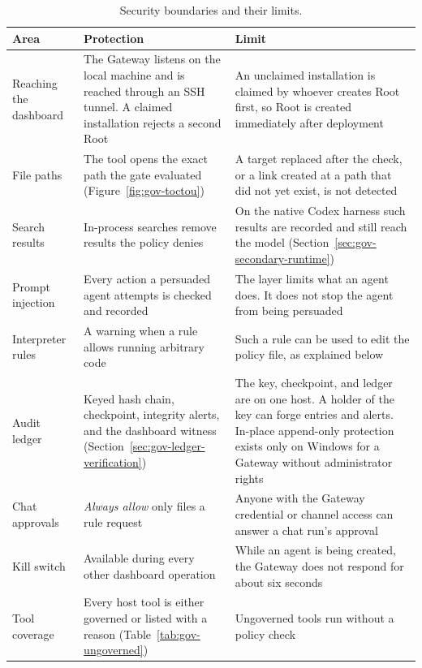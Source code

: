 \begin{table}[htbp]
\centering
\caption{Security boundaries and their limits.}
\label{tab:gov-security-limits}
\small
\begin{tabularx}{\textwidth}{@{}>{\raggedright\arraybackslash}p{}>{\raggedright\arraybackslash}X>{\raggedright\arraybackslash}X@{}}
\toprule
\textbf{Area} & \textbf{Protection} & \textbf{Limit} \\
\midrule
Reaching the dashboard & The Gateway listens on the local machine and is
reached through an SSH tunnel. A claimed installation rejects a second
Root & An unclaimed installation is claimed by whoever creates Root first,
so Root is created immediately after deployment \\
File paths & The tool opens the exact path the gate evaluated
(Figure~\ref{fig:gov-toctou}) & A target replaced after the check, or a
link created at a path that did not yet exist, is not detected \\
Search results & In-process searches remove results the policy denies &
On the native Codex harness such results are recorded and still reach the
model (Section~\ref{sec:gov-secondary-runtime}) \\
Prompt injection & Every action a persuaded agent attempts is checked and
recorded & The layer limits what an agent does. It does not stop the
agent from being persuaded \\
Interpreter rules & A warning when a rule allows running arbitrary code &
Such a rule can be used to edit the policy file, as explained below \\
Audit ledger & Keyed hash chain, checkpoint, integrity alerts, and the
dashboard witness (Section~\ref{sec:gov-ledger-verification}) & The key,
checkpoint, and ledger are on one host. A holder of the key can forge
entries and alerts. In-place append-only protection exists only on Windows
for a Gateway without administrator rights \\
Chat approvals & \textit{Always allow} only files a rule request & Anyone
with the Gateway credential or channel access can answer a chat run's
approval \\
Kill switch & Available during every other dashboard operation & While an
agent is being created, the Gateway does not respond for about six seconds
\\
Tool coverage & Every host tool is either governed or listed with a reason
(Table~\ref{tab:gov-ungoverned}) & Ungoverned tools run without a policy
check \\
\bottomrule
\end{tabularx}
\end{table}

